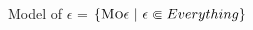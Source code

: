 \documentclass[convert=imagemagick]{standalone}
\begin{document}
    Model of {\LARGE$\epsilon$} = $\left\{ \text{\sc{Mo}}\epsilon\ |\ \epsilon \Subset \sc{Everything}\right\}$
\end{document}
